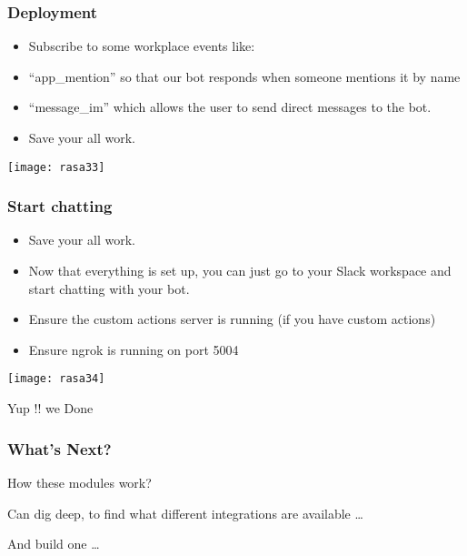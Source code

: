 \begin{frame}[fragile]\frametitle{Deployment}
\begin{itemize}
\item Subscribe to some workplace events like:
\item ``app\_mention'' so that our bot responds when someone mentions it by name
\item ``message_im'' which allows the user to send direct messages to the bot.
\item Save your all work.
\end{itemize}

\begin{center}
\texttt{[image: rasa33]}
\end{center}
\end{frame}

\begin{frame}[fragile]\frametitle{Start chatting }
\begin{itemize}
\item Save your all work.
\item Now that everything is set up, you can just go to your Slack workspace and start chatting with your bot.
\item  Ensure the custom actions server is running (if you have custom actions)
\item Ensure ngrok is running on port 5004
\end{itemize}

\begin{center}
\texttt{[image: rasa34]}
\end{center}

Yup !! we Done
\end{frame}

\begin{frame}[fragile]\frametitle{What's Next?}
How these modules work? 

Can dig deep, to find what different integrations are available \ldots

And build one \ldots

\end{frame}
